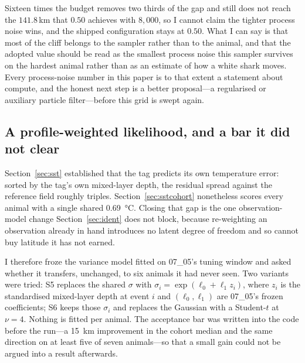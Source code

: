 \documentclass[conference]{IEEEtran}
\begin{document}
Sixteen times the budget removes two thirds of the gap and still does not reach
the $141.8$\,\si{\km} that $0.50$ achieves with $8{,}000$, so I cannot claim
the tighter process noise wins, and the shipped configuration stays at $0.50$.
What I can say is that most of the cliff belongs to the sampler rather than to
the animal, and that the adopted value should be read as the smallest process
noise this sampler survives on the hardest animal rather than as an estimate of
how a white shark moves. Every process-noise number in this paper is to that
extent a statement about compute, and the honest next step is a better
proposal---a regularised or auxiliary particle filter---before this grid is
swept again.

\subsection{A profile-weighted likelihood, and a bar it did not clear}
\label{sec:profile}

Section~\ref{sec:sst} established that the tag predicts its own temperature
error: sorted by the tag's own mixed-layer depth, the residual spread against
the reference field roughly triples. Section~\ref{sec:sstcohort} nonetheless
scores every animal with a single shared \SI{0.69}{\celsius}. Closing that gap
is the one observation-model change Section~\ref{sec:ident} does not block,
because re-weighting an observation already in hand introduces no latent
degree of freedom and so cannot buy latitude it has not earned.

I therefore froze the variance model fitted on 07\_05's tuning window and
asked whether it transfers, unchanged, to six animals it had never seen. Two
variants were tried: S5 replaces the shared $\sigma$ with
$\sigma_i = \exp(\ell_0 + \ell_1 z_i)$, where $z_i$ is the standardised
mixed-layer depth at event $i$ and $(\ell_0, \ell_1)$ are 07\_05's frozen
coefficients; S6 keeps those $\sigma_i$ and replaces the Gaussian with a
Student-$t$ at $\nu = 4$. Nothing is fitted per animal. The acceptance bar was
written into the code before the run---a \SI{15}{\km} improvement in the
cohort median and the same direction on at least five of seven animals---so
that a small gain could not be argued into a result afterwards.
\end{document}
